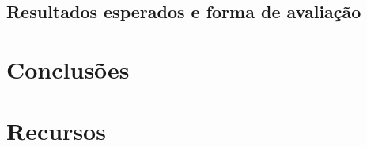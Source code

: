 \documentclass[a4paper]{article}
\begin{document}
\subsection{Resultados esperados e forma de avaliação}

\newpage


\section{Conclusões}

\newpage


\section{Recursos}

\newpage
\end{document}
